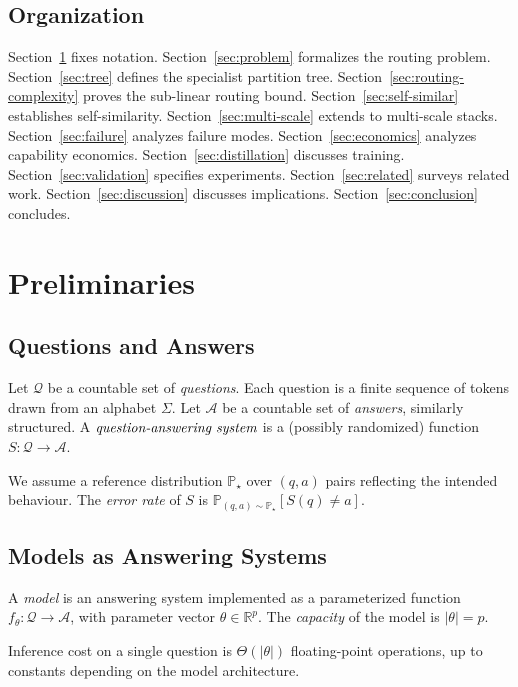 \documentclass[11pt,twocolumn,a4paper]{article}
\theoremstyle{definition}
\theoremstyle{remark}
\newcommand{\R}{\mathbb{R}}
\renewcommand{\Pr}{\mathbb{P}}
\newcommand{\Qc}{\mathcal{Q}}
\begin{document}
\subsection{Organization}

Section~\ref{sec:preliminaries} fixes notation.
Section~\ref{sec:problem} formalizes the routing problem.
Section~\ref{sec:tree} defines the specialist partition tree.
Section~\ref{sec:routing-complexity} proves the sub-linear routing bound.
Section~\ref{sec:self-similar} establishes self-similarity.
Section~\ref{sec:multi-scale} extends to multi-scale stacks.
Section~\ref{sec:failure} analyzes failure modes.
Section~\ref{sec:economics} analyzes capability economics.
Section~\ref{sec:distillation} discusses training.
Section~\ref{sec:validation} specifies experiments.
Section~\ref{sec:related} surveys related work.
Section~\ref{sec:discussion} discusses implications.
Section~\ref{sec:conclusion} concludes.

\section{Preliminaries}
\label{sec:preliminaries}

\subsection{Questions and Answers}

Let $\Qc$ be a countable set of \emph{questions}. Each question is a finite sequence of tokens drawn from an alphabet $\Sigma$. Let $\mathcal{A}$ be a countable set of \emph{answers}, similarly structured. A $\emph{question-answering system}$ is a (possibly randomized) function $S: \Qc \to \mathcal{A}$.

We assume a reference distribution $\Pr_{\star}$ over $(q, a)$ pairs reflecting the intended behaviour. The \emph{error rate} of $S$ is $\Pr_{(q,a) \sim \Pr_{\star}}[S(q) \neq a]$.

\subsection{Models as Answering Systems}

A \emph{model} is an answering system implemented as a parameterized function $f_\theta: \Qc \to \mathcal{A}$, with parameter vector $\theta \in \R^p$. The \emph{capacity} of the model is $|\theta| = p$.

Inference cost on a single question is $\Theta(|\theta|)$ floating-point operations, up to constants depending on the model architecture.
\end{document}

